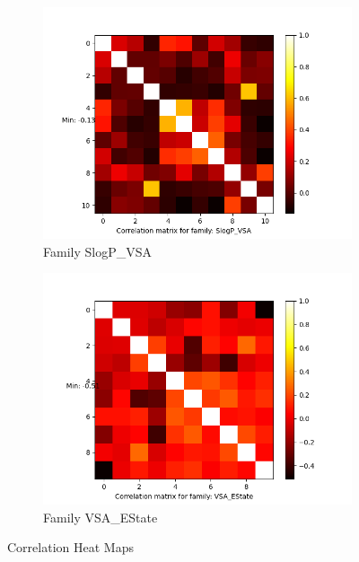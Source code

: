 \documentclass[11pt]{article}
\begin{document}
\begin{figure}
      \hfill
     \begin{subfigure}[b]{0.45\textwidth}
         \centering
        \includegraphics[scale=0.5]{images/correlationSlogPVSA}
        \caption{Family SlogP\_VSA}
        \label{fig:correlationSlogPVSA}
     \end{subfigure}
             \hfill
     \begin{subfigure}[b]{0.45\textwidth}
         \centering
        \includegraphics[scale=0.5]{images/correlationVSAEState}
        \caption{Family VSA\_EState}
        \label{fig:correlationVSAEState}
     \end{subfigure}     
     \caption{Correlation Heat Maps}
     \label{fig:CorrHeatMapFig}
\end{figure}
\end{document}
